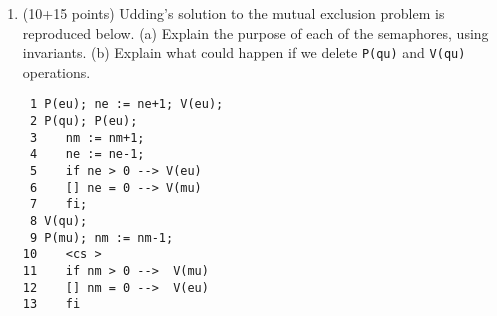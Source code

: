 \begin{enumerate}
\item (10+15 points)  Udding's solution to the mutual exclusion problem
is reproduced below.  (a) Explain the purpose of each of the
semaphores, using invariants. (b)  Explain what could happen if
we delete {\tt P(qu)} and {\tt V(qu)} operations.

\begin{verbatim}
 1 P(eu); ne := ne+1; V(eu);
 2 P(qu); P(eu);        
 3    nm := nm+1;        
 4    ne := ne-1;        
 5    if ne > 0 --> V(eu) 
 6    [] ne = 0 --> V(mu) 
 7    fi;            
 8 V(qu);            
 9 P(mu); nm := nm-1;        
10    <cs >            
11    if nm > 0 -->  V(mu)
12    [] nm = 0 -->  V(eu)
13    fi            
\end{verbatim}

\end{enumerate}

